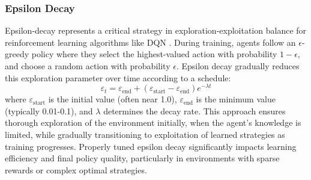 \subsubsection{Epsilon Decay}

Epsilon-decay represents a critical strategy in exploration-exploitation balance for reinforcement learning algorithms like DQN \cite{singh2019reinforcementlearning}. 
During training, agents follow an $\epsilon$-greedy policy where they select the highest-valued action with probability $1-\epsilon$, and choose a random action with probability $\epsilon$.
Epsilon decay gradually reduces this exploration parameter over time according to a schedule:
$$\varepsilon_t = \varepsilon_{\text{end}} + (\varepsilon_{\text{start}} - \varepsilon_{\text{end}})e^{-\lambda t}$$
where $\varepsilon_{\text{start}}$ is the initial value (often near 1.0), $\varepsilon_{\text{end}}$ is the minimum value (typically 0.01-0.1), and $\lambda$ determines the decay rate.
This approach ensures thorough exploration of the environment initially, when the agent's knowledge is limited, while gradually transitioning to exploitation of learned strategies as training progresses. 
Properly tuned epsilon decay significantly impacts learning efficiency and final policy quality, particularly in environments with sparse rewards or complex optimal strategies.